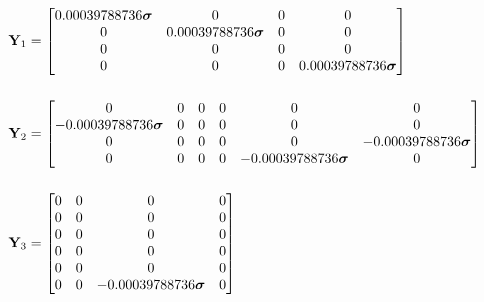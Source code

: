 \begin{align}
\mathbf{Y}_1 &= \left[\begin{matrix}0.00039788736 \boldsymbol{\sigma} & 0 & 0 & 0\\0 & 0.00039788736 \boldsymbol{\sigma} & 0 & 0\\0 & 0 & 0 & 0\\0 & 0 & 0 & 0.00039788736 \boldsymbol{\sigma}\end{matrix}\right] \label{eq:example_y1} \\[5mm]
\mathbf{Y}_2 &= \left[\begin{matrix}0 & 0 & 0 & 0 & 0 & 0\\- 0.00039788736 \boldsymbol{\sigma} & 0 & 0 & 0 & 0 & 0\\0 & 0 & 0 & 0 & 0 & - 0.00039788736 \boldsymbol{\sigma}\\0 & 0 & 0 & 0 & - 0.00039788736 \boldsymbol{\sigma} & 0\end{matrix}\right] \label{eq:example_y2} \\[5mm]
\mathbf{Y}_3 &= \left[\begin{matrix}0 & 0 & 0 & 0\\0 & 0 & 0 & 0\\0 & 0 & 0 & 0\\0 & 0 & 0 & 0\\0 & 0 & 0 & 0\\0 & 0 & - 0.00039788736 \boldsymbol{\sigma} & 0\end{matrix}\right] \label{eq:example_y3}
\end{align}

